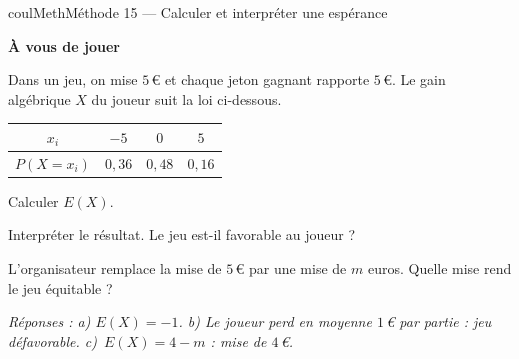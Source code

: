 \documentclass[11pt,a4paper]{article}
\makeatletter
\newcounter{lycee@signet}
\newcommand{\signet}[3][]{\stepcounter{lycee@signet}%
  \edef\lycee@dest{\if\relax\detokenize{#1}\relax
    signet.\arabic{lycee@signet}\else#1\fi}%
  \hypertarget{\lycee@dest}{}\bookmark[level=#2,dest=\lycee@dest]{#3}}
\newcounter{methode}
\newenvironment{methodebox}[1][Méthode]{\stepcounter{methode}%
  \begin{boitecours}[phantom={\signet[methode-\arabic{methode}]{2}{#1}}]{coulMeth}{#1}}%
  {\end{boitecours}}
\newcommand{\etape}[1]{\par\smallskip\textbf{\color{coulMeth}#1}\par\nobreak\smallskip}
\newcommand{\reponse}[1]{\par\smallskip
  {\footnotesize\itshape\color{black!55}Réponses : #1}}
\makeatother
\begin{document}
\begin{methodebox}[Méthode 15 --- Calculer et interpréter une espérance]
\etape{À vous de jouer}
Dans un jeu, on mise $5$\,€ et chaque jeton gagnant rapporte $5$\,€. Le gain algébrique
$X$ du joueur suit la loi ci-dessous.
\begin{center}
\renewcommand{\arraystretch}{1.4}
\begin{tabular}{|c|c|c|c|}
\hline
$x_{i}$ & $-5$ & $0$ & $5$\\\hline
$P(X=x_{i})$ & $0{,}36$ & $0{,}48$ & $0{,}16$\\\hline
\end{tabular}
\end{center}
\begin{questions}[label=\alph*)]
  \item Calculer $E(X)$.
  \item Interpréter le résultat. Le jeu est-il favorable au joueur ?
  \item L'organisateur remplace la mise de $5$\,€ par une mise de $m$ euros. Quelle mise
    rend le jeu équitable ?
\end{questions}
\reponse{a) $E(X)=-1$.\; b) Le joueur perd en moyenne $1$\,€ par partie : jeu
défavorable.\; c)~$E(X)=4-m$ : mise de $4$\,€.}
\end{methodebox}
\end{document}
